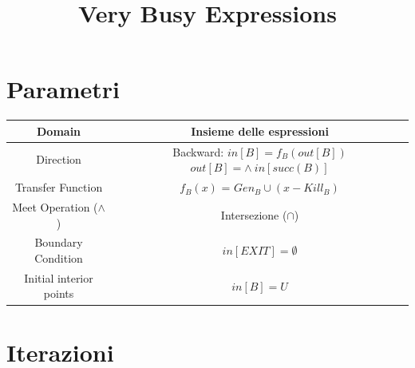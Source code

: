 \documentclass{article}
\title{\Huge{Very Busy Expressions}}
\date{}
\begin{document}
	
	\maketitle
	
	\section{Parametri}
	
	\begin{table}[h]
		\centering
		\Large
		\renewcommand{\arraystretch}{1.4}
		\begin{tabular}{|c|c|}
			\hline
			Domain &  Insieme delle espressioni \\
			\hline
			Direction &  \makecell[l]{Backward: \\ $in[B] = f_B(out[B])$ \\ $out[B] = \wedge\ in[succ(B)]$} \\
			\hline
			Transfer Function &  $f_B(x)$ = $Gen_B \cup (x - Kill_B)$ \\
			\hline
			Meet Operation ($\wedge$) &  Intersezione ($\cap$) \\
			\hline
			Boundary Condition &  $in[EXIT] = \emptyset$ \\
			\hline
			Initial interior points &  $in[B] = U$ \\
			\hline
		\end{tabular}
	\end{table}
	
	\vspace{1cm}
	
	\section{Iterazioni}
	
\end{document}
